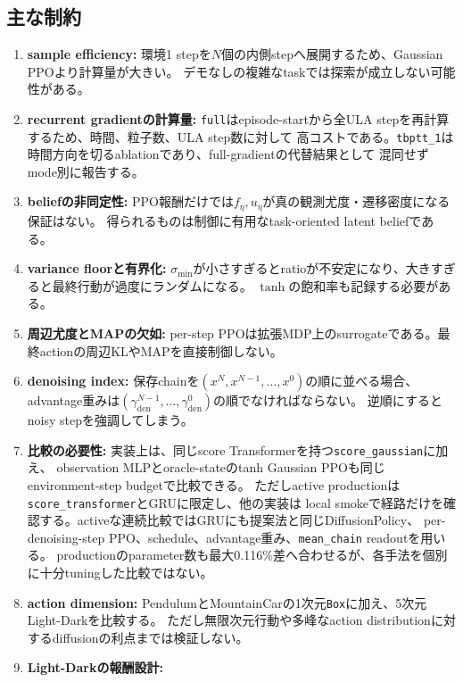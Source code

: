 \documentclass[a4paper,11pt]{article}
\newcommand{\den}{\mathrm{den}}
\begin{document}
\subsection{主な制約}

\begin{enumerate}
  \item \textbf{sample efficiency:}
    環境1 stepを$N$個の内側stepへ展開するため、Gaussian PPOより計算量が大きい。
    デモなしの複雑なtaskでは探索が成立しない可能性がある。
  \item \textbf{recurrent gradientの計算量:}
    \texttt{full}はepisode-startから全ULA stepを再計算するため、時間、粒子数、ULA step数に対して
    高コストである。\texttt{tbptt\_1}は時間方向を切るablationであり、full-gradientの代替結果として
    混同せずmode別に報告する。
  \item \textbf{beliefの非同定性:}
    PPO報酬だけでは$f_\eta,u_\eta$が真の観測尤度・遷移密度になる保証はない。
    得られるものは制御に有用なtask-oriented latent beliefである。
  \item \textbf{variance floorと有界化:}
    $\sigma_{\min}$が小さすぎるとratioが不安定になり、大きすぎると最終行動が過度にランダムになる。
    $\tanh$の飽和率も記録する必要がある。
  \item \textbf{周辺尤度とMAPの欠如:}
    per-step PPOは拡張MDP上のsurrogateである。最終actionの周辺KLやMAPを直接制御しない。
  \item \textbf{denoising index:}
    保存chainを$(x^N,x^{N-1},\ldots,x^0)$の順に並べる場合、
    advantage重みは$(\gamma_{\den}^{N-1},\ldots,\gamma_{\den}^{0})$の順でなければならない。
    逆順にするとnoisy stepを強調してしまう。
  \item \textbf{比較の必要性:}
    実装上は、同じscore Transformerを持つ\texttt{score\_gaussian}に加え、
    observation MLPとoracle-stateのtanh Gaussian PPOも同じenvironment-step budgetで比較できる。
    ただしactive productionは\texttt{score\_transformer}とGRUに限定し、他の実装は
    local smokeで経路だけを確認する。activeな連続比較ではGRUにも提案法と同じDiffusionPolicy、
    per-denoising-step PPO、schedule、advantage重み、\texttt{mean\_chain} readoutを用いる。
    productionのparameter数も最大0.116\%差へ合わせるが、各手法を個別に十分tuningした比較ではない。
  \item \textbf{action dimension:}
    PendulumとMountainCarの1次元\texttt{Box}に加え、5次元Light-Darkを比較する。
    ただし無限次元行動や多峰なaction distributionに対するdiffusionの利点までは検証しない。
  \item \textbf{Light-Darkの報酬設計:}

\end{enumerate}
\end{document}
